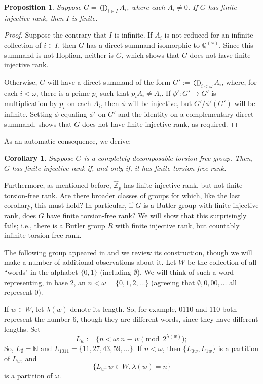 \documentclass[12pt]{amsart}
\newtheorem{proposition}[theorem]{Proposition}
\newtheorem{corollary}[theorem]{Corollary}
\theoremstyle{definition}
\def\Z{{\mathbb Z}}
\def\Q{{\mathbb Q}}
\def\N{{\mathbb N}}
\begin{document}
\begin{proposition}
Suppose $G=\bigoplus_{i\in I} A_i$, where each $A_i\ne 0$. If $G$ has finite injective rank, then $I$ is finite.
\end{proposition}

\begin{proof}
Suppose the contrary that $I$ is infinite. If $A_i$ is not reduced for an infinite collection of $i\in I$, then $G$ has a direct summand isomorphic to $\Q^{(\omega)}$. Since this summand is not Hopfian, neither is $G$, which shows that $G$ does not have finite injective rank.

Otherwise, $G$ will have a direct summand of the form $G':=\bigoplus_{i<\omega}A_i$, where, for each $i<\omega$, there is a prime $p_i$ such that $p_i A_i\ne A_i$. If $\phi': G'\to G'$ is multiplication by $p_i$ on each $A_i$, then $\phi$ will be injective, but $G'/\phi'(G')$ will be infinite. Setting $\phi$ equaling $\phi'$ on $G'$ and the identity on a complementary direct summand, shows that $G$ does not have finite injective rank, as required.
\end{proof}

As an automatic consequence, we derive:

\begin{corollary} Suppose $G$ is a completely decomposable torsion-free group. Then, $G$ has finite injective rank if, and only if, it has finite torsion-free rank.
\end{corollary}

Furthermore, as mentioned before, $\hat \Z_p$ has finite injective rank, but not finite torsion-free rank. Are there broader classes of groups for which, like the last corollary, this must hold? In particular, if $G$ is a Butler group with finite injective rank, does $G$ have finite torsion-free rank? We will show that this surprisingly fails; i.e., there is a Butler group $R$ with finite injective rank, but countably infinite torsion-free rank.

\medskip

The following group appeared in \cite{AR} and we review its construction, though we will make a number of additional observations about it. Let $W$ be the collection of all ``words" in the alphabet $\{0,1\}$ (including $\emptyset$).  We will think of such a word representing, in base 2, an $n<\omega= \{0,1,2, \dots\}$ (agreeing that $\emptyset, 0, 00, \dots$ all represent 0).

If $w\in W$, let $\lambda(w)$ denote its length. So, for example, $0110$ and $110$ both represent the number 6, though they are different words, since they have different lengths. Set
$$
       L_w:=\{n<\omega: n\equiv w \pmod {2^{\lambda(w)}};
$$
So, $L_\emptyset = \N$ and $L_{1011}=\{11, 27, 43, 59, \dots\}$. If $n<\omega$, then $\{L_{0w}, L_{1w}\}$ is a partition of $L_{w}$, and
$$
             \{ L_w:w\in W, \lambda(w)=n\}
$$
is a partition of $\omega$.
\end{document}
